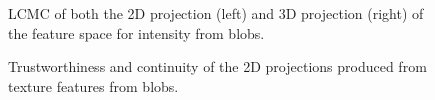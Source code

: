 \begin{figure}[H]
	\centering
	\caption{LCMC of both the 2D projection (left) and 3D projection (right) of the feature space for intensity from blobs.}\label{fig:LCMC_blobs}
\end{figure}
\clearpage

\clearpage
\begin{figure}[H]
	\centering
	\caption{Trustworthiness and continuity of the 2D projections produced from texture features from blobs.}\label{fig:TC_2d_blobs}
\end{figure}

